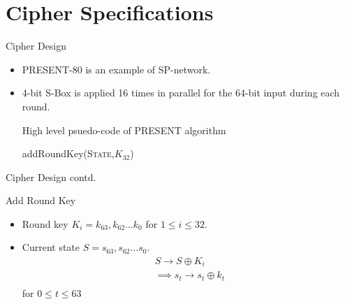 \section{Cipher Specifications}

\begin{frame}[c]{Cipher Design}
\begin{itemize}
    \item PRESENT-80 is an example of SP-network.
    \item 4-bit S-Box is applied 16 times in parallel for the 64-bit input during each round.
    \begin{block}{High level psuedo-code of PRESENT algorithm}
        \begin{algorithmic}[1]
        \ENDFOR
        \STATE addRoundKey(\textsc{State},$K_{32}$)
        \end{algorithmic}
    \end{block}
\end{itemize}
\end{frame}

\begin{frame}{Cipher Design contd.}
       \begin{block}{Add Round Key}
           \begin{itemize}
               \item Round key $K_i = k_{63},k_{62} \dots k_0$ for $1\leq i \leq 32$.
               \item Current state $S = s_{63},s_{62}\dots s_0$.
               \begin{eqnarray*}
                    S \xrightarrow{} S \oplus K_i \\
                    \implies s_t \xrightarrow[]{} s_t \oplus k_t
                \end{eqnarray*}
                for $0\leq t\leq 63$
           \end{itemize}
       \end{block}
\end{frame}

